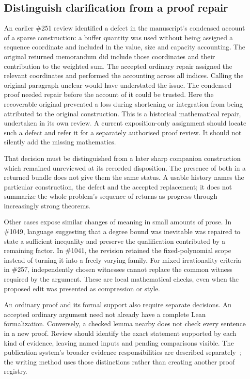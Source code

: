 \subsection{Distinguish clarification from a proof repair}

An earlier \#251 review identified a defect in the manuscript's condensed
account of a sparse construction: a buffer quantity was used without being
assigned a sequence coordinate and included in the value, size and capacity
accounting. The original returned memorandum did include those coordinates
and their contribution to the weighted sum. The accepted ordinary
repair assigned the relevant coordinates and performed the accounting across
all indices. Calling the original paragraph unclear would have understated
the issue. The condensed proof needed repair before the account of it could be trusted.
Here the recoverable original prevented a loss during shortening or integration
from being attributed to the original construction. This is a historical
mathematical repair, undertaken in its own review. A current exposition-only
assignment should locate such a defect and refer it for a separately authorised
proof review. It should not silently add the missing mathematics.

That decision must be distinguished from a later sharp companion construction
which remained unreviewed at its recorded disposition. The presence of both
in a returned bundle does not give them the same status. A usable history
names the particular construction, the defect and the accepted replacement;
it does not summarize the whole problem's sequence of returns as progress
through increasingly strong theorems.

Other cases expose similar changes of meaning in small amounts of prose.
In \#1049, language suggesting that a degree bound was inevitable was repaired
to state a sufficient inequality and preserve the qualification contributed
by a remaining factor. In \#1041, the revision retained the fixed-polynomial
scope instead of turning it into a freely varying family. For mixed
irrationality criteria in \#257, independently chosen witnesses cannot replace
the common witness required by the argument. These are local mathematical
checks, even when the proposed edit was presented as compression or style.

An ordinary proof and its formal support also require separate decisions.
An accepted ordinary argument need not already have a complete Lean
formalization. Conversely, a checked lemma nearby does not check every
sentence in a new proof. Review should identify the exact statement supported
by each kind of evidence, leaving named inputs and pending comparisons visible.
The publication system's broader evidence responsibilities are described
separately~\cite{systems}; the writing method uses those distinctions rather
than creating another proof registry.

